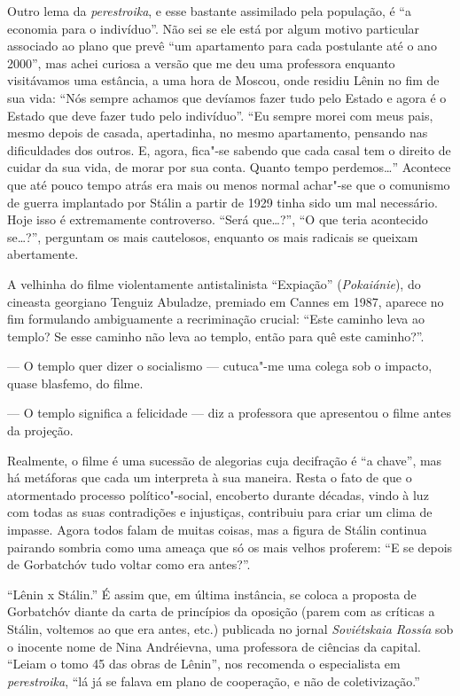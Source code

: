 Outro lema da \emph{perestroika}, e esse bastante assimilado pela população, é ``a economia para o indivíduo''. Não sei se ele está por algum motivo particular associado ao plano que prevê ``um apartamento para cada postulante até o ano 2000'', mas achei curiosa a versão que me deu uma professora enquanto visitávamos uma estância, a uma hora de Moscou, onde residiu Lênin no fim de sua vida: ``Nós sempre achamos que devíamos fazer tudo pelo Estado e agora é o Estado que deve fazer tudo pelo indivíduo''. ``Eu sempre morei com meus pais, mesmo depois de casada, apertadinha, no mesmo apartamento, pensando nas dificuldades dos outros. E, agora, fica"-se sabendo que cada casal tem o direito de cuidar da sua vida, de morar por sua conta. Quanto tempo perdemos\ldots{}'' Acontece que até pouco tempo atrás era mais ou menos normal achar"-se que o comunismo de guerra implantado por Stálin a partir de 1929 tinha sido um mal necessário. Hoje isso é extremamente controverso. ``Será que\ldots{}?'', ``O que teria acontecido se\ldots{}?'', perguntam os mais cautelosos, enquanto os mais radicais se queixam abertamente.

A velhinha do filme violentamente antistalinista ``Expiação'' (\emph{Pokaiánie}), do cineasta georgiano Tenguiz Abuladze, premiado em Cannes em 1987, aparece no fim formulando ambiguamente a recriminação crucial: ``Este caminho leva ao templo? Se esse caminho não leva ao templo, então para quê este caminho?''.

--- O templo quer dizer o socialismo --- cutuca"-me uma colega sob o impacto, quase blasfemo, do filme.

--- O templo significa a felicidade --- diz a professora que apresentou o filme antes da projeção.

Realmente, o filme é uma sucessão de alegorias cuja decifração é ``a chave'', mas há metáforas que cada um interpreta à sua maneira. Resta o fato de que o atormentado processo político"-social, encoberto durante décadas, vindo à luz com todas as suas contradições e injustiças, contribuiu para criar um clima de impasse. Agora todos falam de muitas coisas, mas a figura de Stálin continua pairando sombria como uma ameaça que só os mais velhos proferem: ``E se depois de Gorbatchóv tudo voltar como era antes?''.

``Lênin x Stálin.'' É assim que, em última instância, se coloca a proposta de Gorbatchóv diante da carta de princípios da oposição (parem com as críticas a Stálin, voltemos ao que era antes, etc.) publicada no jornal \emph{Soviétskaia Rossía} sob o inocente nome de Nina Andréievna, uma professora de ciências da capital. ``Leiam o tomo 45 das obras de Lênin'', nos recomenda o especialista em \emph{perestroika}, ``lá já se falava em plano de cooperação, e não de coletivização.''

